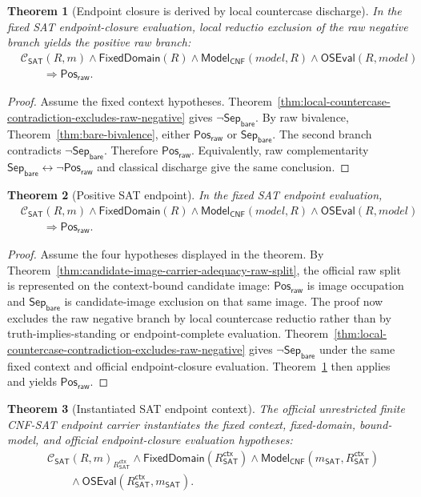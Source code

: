 \documentclass[11pt]{article}
\newtheorem{theorem}{Theorem}[section]
\theoremstyle{definition}
\theoremstyle{remark}
\newcommand{\PosRaw}{\mathsf{Pos}_{\mathsf{raw}}}
\newcommand{\SepBare}{\mathsf{Sep}_{\mathsf{bare}}}
\newcommand{\ClayCtx}{\mathcal{C}_{\mathsf{SAT}}(R,m)}
\newcommand{\RSATctx}{R_{\mathsf{SAT}}^{\mathsf{ctx}}}
\newcommand{\FixedDom}{\mathsf{FixedDomain}}
\newcommand{\ModelOfCnf}{\mathsf{Model}_{\mathsf{CNF}}}
\newcommand{\OfficialSATEval}{\mathsf{OSEval}}
\begin{document}
\begin{theorem}[Endpoint closure is derived by local countercase discharge]
\label{thm:endpoint-closure-derived-not-assumed}
In the fixed SAT endpoint-closure evaluation, local reductio exclusion of the raw negative branch yields the positive raw branch:
\[
\begin{aligned}
  &\ClayCtx\wedge\FixedDom(R)\wedge\ModelOfCnf(model,R)\wedge\OfficialSATEval(R,model)\\
  &\qquad\Rightarrow \PosRaw.
\end{aligned}
\]
\end{theorem}

\begin{proof}
Assume the fixed context hypotheses. Theorem~\ref{thm:local-countercase-contradiction-excludes-raw-negative} gives \(\neg\SepBare\). By raw bivalence, Theorem~\ref{thm:bare-bivalence}, either \(\PosRaw\) or \(\SepBare\). The second branch contradicts \(\neg\SepBare\). Therefore \(\PosRaw\). Equivalently, raw complementarity \(\SepBare\leftrightarrow\neg\PosRaw\) and classical discharge give the same conclusion.
\end{proof}

\begin{theorem}[Positive SAT endpoint]
\label{thm:positive}
In the fixed SAT endpoint evaluation,
\[
\begin{aligned}
  &\ClayCtx\wedge\FixedDom(R)\wedge\ModelOfCnf(model,R)\wedge\OfficialSATEval(R,model)\\
  &\qquad\Rightarrow \PosRaw.
\end{aligned}
\]
\end{theorem}

\begin{proof}
Assume the four hypotheses displayed in the theorem. By Theorem~\ref{thm:candidate-image-carrier-adequacy-raw-split}, the official raw split is represented on the context-bound candidate image: \(\PosRaw\) is image occupation and \(\SepBare\) is candidate-image exclusion on that same image. The proof now excludes the raw negative branch by local countercase reductio rather than by truth-implies-standing or endpoint-complete evaluation. Theorem~\ref{thm:local-countercase-contradiction-excludes-raw-negative} gives \(\neg\SepBare\) under the same fixed context and official endpoint-closure evaluation. Theorem~\ref{thm:endpoint-closure-derived-not-assumed} then applies and yields \(\PosRaw\).
\end{proof}

\begin{theorem}[Instantiated SAT endpoint context]
\label{thm:rsat-context}
The official unrestricted finite CNF-SAT endpoint carrier instantiates the fixed context, fixed-domain, bound-model, and official endpoint-closure evaluation hypotheses:
\[
\begin{aligned}
  &\ClayCtx_{\RSATctx}\wedge\FixedDom(\RSATctx)\wedge\ModelOfCnf(m_{\mathsf{SAT}},\RSATctx)\\
  &\qquad\wedge\OfficialSATEval(\RSATctx,m_{\mathsf{SAT}}).
\end{aligned}
\]
\end{theorem}
\end{document}
